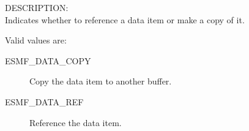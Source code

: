 {\sf DESCRIPTION:\\}
Indicates whether to reference a data item or make a copy of it.

Valid values are:
\begin{description}
\item [ESMF\_DATA\_COPY]
      Copy the data item to another buffer.
\item [ESMF\_DATA\_REF]
      Reference the data item.
\end{description}

\mbox{}\hrulefill\












